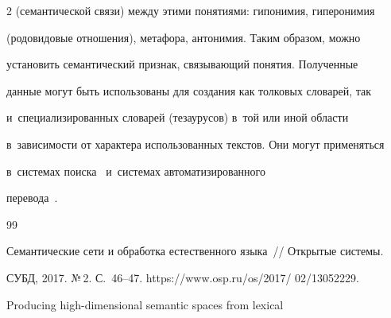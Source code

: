 \begin{multicols}{2}
(семантической связи) между этими понятиями: гипонимия, гиперонимия 


(родовидовые отношения), метафора, антонимия. Таким образом, можно 


установить семантический признак, свя\-зы\-ва\-ющий понятия. Полученные 


данные могут быть использованы для создания как толковых словарей, так 


и~специализированных словарей (тезаурусов) в~той или иной об\-ласти 


в~зависимости от характера использованных текс\-тов. Они могут применяться 


в~сис\-те\-мах поиска~\cite{12-an, 13-an} и~сис\-те\-мах автоматизированного 


перевода~\cite{14-an, 15-an}.


    


{\small\frenchspacing


 {%




 \begin{thebibliography}{99}






















 Семантические сети и обработка естественного языка~// Открытые системы. 


СУБД, 2017. №\,2. С.~46--47. {\sf https://www.osp.ru/os/2017/ 02/13052229}.




 Producing high-dimensional semantic spaces from lexical  



\end{thebibliography}}}
\end{multicols}

